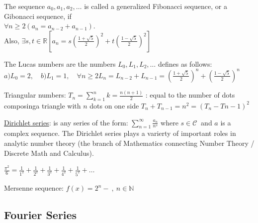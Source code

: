 \documentclass[12pt]{article}
\begin{document}
\begin{flushleft}
	\textbullet \quad The sequence $a_0, a_1, a_2, \ldots$ is called a generalized Fibonacci sequence, or a Gibonacci sequence, if \\ $\forall n \geq 2(a_n = a_{n-2} + a_{n-1} )$. \\
	Also, $\displaystyle \exists s,t \in \mathbb{R} \left[ a_n = s\left(\frac{1+\sqrt{5}}{2} \right)^2 + t\left( \frac{1-\sqrt{5}}{2} \right)^2 \right] $ \linebreak 
	
	\textbullet \quad The Lucas numbers are the numbers $L_0, L_1, L_2, \ldots $ defines as follows: $\displaystyle a) L_0 = 2, \quad	 b) L_1 = 1, \quad \forall n \geq 2 L_n = L_{n-2} + L_{n-1} = \left(\frac{1+\sqrt{5}}{2}\right)^n + \left(\frac{1-\sqrt{5}}{2}\right)^n $ \linebreak 

	\textbullet \quad Triangular numbers: $T_n = \sum \limits_{k=1}^n k = \frac{n(n+1)}{2} $  :  equal to the number of dots composinga triangle with $n$ dots on one side \linebreak 
	\textbullet \quad $T_n + T_{n-1} = n^2 = (T_n - T{n-1})^2 $ \linebreak 
	
	\textbullet \quad \uline{Dirichlet series}: is any series of the form: \linebreak 
	$\displaystyle \sum\limits_{n=1}^{\infty} \frac{a_n}{n^s} $ \linebreak 
	where $s \in \mathcal{C} \ $ and $a$ is a complex sequence. The Dirichlet series plays a varierty of important roles in analytic number theory (the branch of Mathematics connecting Number Theory / Discrete Math and Calculus). \linebreak 
	
	\textbullet \quad $\displaystyle \frac{\pi^2}{6} = \frac{1}{1^2} + \frac{1}{2^2} + \frac{1}{3^2} + \frac{1}{4^2} + \frac{1}{5^2} + \ldots $ \linebreak 
	
	\textbullet \quad Mersenne sequence: $ f(x) = 2^n - \ , \ n \in \mathbb{N} $ \linebreak 
	
	\subsection{Fourier Series}
	

\end{flushleft}
\end{document}
